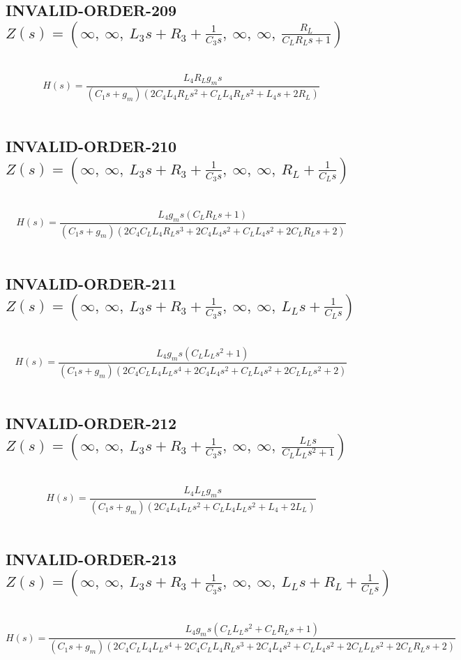 \documentclass{article}
\begin{document}
\subsection{INVALID-ORDER-209 $Z(s) = \left( \infty, \  \infty, \  L_{3} s + R_{3} + \frac{1}{C_{3} s}, \  \infty, \  \infty, \  \frac{R_{L}}{C_{L} R_{L} s + 1}\right)$ } \ 
\textbf{\[H(s) = \frac{L_{4} R_{L} g_{m} s}{\left(C_{1} s + g_{m}\right) \left(2 C_{4} L_{4} R_{L} s^{2} + C_{L} L_{4} R_{L} s^{2} + L_{4} s + 2 R_{L}\right)}\] } \ 
\subsection{INVALID-ORDER-210 $Z(s) = \left( \infty, \  \infty, \  L_{3} s + R_{3} + \frac{1}{C_{3} s}, \  \infty, \  \infty, \  R_{L} + \frac{1}{C_{L} s}\right)$ } \ 
\textbf{\[H(s) = \frac{L_{4} g_{m} s \left(C_{L} R_{L} s + 1\right)}{\left(C_{1} s + g_{m}\right) \left(2 C_{4} C_{L} L_{4} R_{L} s^{3} + 2 C_{4} L_{4} s^{2} + C_{L} L_{4} s^{2} + 2 C_{L} R_{L} s + 2\right)}\] } \ 
\subsection{INVALID-ORDER-211 $Z(s) = \left( \infty, \  \infty, \  L_{3} s + R_{3} + \frac{1}{C_{3} s}, \  \infty, \  \infty, \  L_{L} s + \frac{1}{C_{L} s}\right)$ } \ 
\textbf{\[H(s) = \frac{L_{4} g_{m} s \left(C_{L} L_{L} s^{2} + 1\right)}{\left(C_{1} s + g_{m}\right) \left(2 C_{4} C_{L} L_{4} L_{L} s^{4} + 2 C_{4} L_{4} s^{2} + C_{L} L_{4} s^{2} + 2 C_{L} L_{L} s^{2} + 2\right)}\] } \ 
\subsection{INVALID-ORDER-212 $Z(s) = \left( \infty, \  \infty, \  L_{3} s + R_{3} + \frac{1}{C_{3} s}, \  \infty, \  \infty, \  \frac{L_{L} s}{C_{L} L_{L} s^{2} + 1}\right)$ } \ 
\textbf{\[H(s) = \frac{L_{4} L_{L} g_{m} s}{\left(C_{1} s + g_{m}\right) \left(2 C_{4} L_{4} L_{L} s^{2} + C_{L} L_{4} L_{L} s^{2} + L_{4} + 2 L_{L}\right)}\] } \ 
\subsection{INVALID-ORDER-213 $Z(s) = \left( \infty, \  \infty, \  L_{3} s + R_{3} + \frac{1}{C_{3} s}, \  \infty, \  \infty, \  L_{L} s + R_{L} + \frac{1}{C_{L} s}\right)$ } \ 
\textbf{\[H(s) = \frac{L_{4} g_{m} s \left(C_{L} L_{L} s^{2} + C_{L} R_{L} s + 1\right)}{\left(C_{1} s + g_{m}\right) \left(2 C_{4} C_{L} L_{4} L_{L} s^{4} + 2 C_{4} C_{L} L_{4} R_{L} s^{3} + 2 C_{4} L_{4} s^{2} + C_{L} L_{4} s^{2} + 2 C_{L} L_{L} s^{2} + 2 C_{L} R_{L} s + 2\right)}\] } \ 
\end{document}
